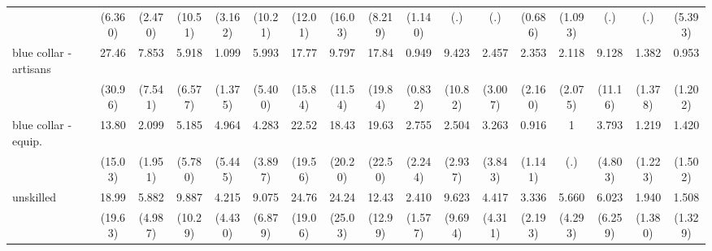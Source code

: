 {\begin{tabular}{l*{16}{c}}
                    &     (6.360)         &     (2.470)         &     (10.51)         &     (3.162)         &     (10.21)         &     (12.01)         &     (16.03)         &     (8.219)         &     (1.140)         &         (.)         &         (.)         &     (0.686)         &     (1.093)         &         (.)         &         (.)         &     (5.393)         \\
[1em]
blue collar - artisans&       27.46\sym{**} &       7.853\sym{*}  &       5.918         &       1.099         &       5.993\sym{*}  &       17.77\sym{**} &       9.797         &       17.84\sym{**} &       0.949         &       9.423         &       2.457         &       2.353         &       2.118         &       9.128         &       1.382         &       0.953         \\
                    &     (30.96)         &     (7.541)         &     (6.577)         &     (1.375)         &     (5.400)         &     (15.84)         &     (11.54)         &     (19.84)         &     (0.832)         &     (10.82)         &     (3.007)         &     (2.160)         &     (2.075)         &     (11.16)         &     (1.378)         &     (1.202)         \\
[1em]
blue collar - equip.&       13.80\sym{*}  &       2.099         &       5.185         &       4.964         &       4.283         &       22.52\sym{***}&       18.43\sym{**} &       19.63\sym{**} &       2.755         &       2.504         &       3.263         &       0.916         &           1         &       3.793         &       1.219         &       1.420         \\
                    &     (15.03)         &     (1.951)         &     (5.780)         &     (5.445)         &     (3.897)         &     (19.56)         &     (20.20)         &     (22.50)         &     (2.244)         &     (2.937)         &     (3.843)         &     (1.141)         &         (.)         &     (4.803)         &     (1.223)         &     (1.502)         \\
[1em]
unskilled           &       18.99\sym{**} &       5.882\sym{*}  &       9.887\sym{*}  &       4.215         &       9.075\sym{**} &       24.76\sym{***}&       24.24\sym{**} &       12.43\sym{*}  &       2.410         &       9.623\sym{*}  &       4.417         &       3.336         &       5.660\sym{*}  &       6.023         &       1.940         &       1.508         \\
                    &     (19.63)         &     (4.987)         &     (10.29)         &     (4.430)         &     (6.879)         &     (19.06)         &     (25.03)         &     (12.99)         &     (1.577)         &     (9.694)         &     (4.311)         &     (2.193)         &     (4.293)         &     (6.259)         &     (1.380)         &     (1.329)         \\

\end{tabular}}
